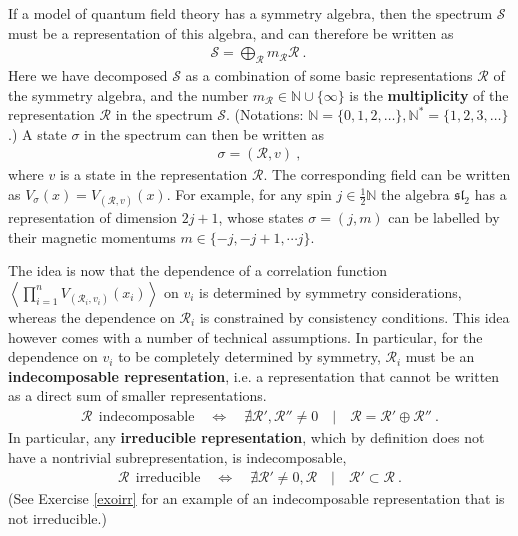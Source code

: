 \documentclass[12pt, a4paper, notitlepage, twoside]{report}
\numberwithin{equation}{section}
\theoremstyle{break}
\begin{document}
If a model of quantum field theory has a symmetry algebra, then the spectrum $\mathcal{S}$ must be a representation of this algebra, and can therefore be written as
\begin{align}
 \mathcal{S} = \bigoplus_\mathcal{R} m_\mathcal{R}  \mathcal{R}\ .\
\label{somr}
\end{align}
Here we have decomposed $\mathcal{S}$ as a combination of some basic representations $\mathcal{R}$ of the symmetry algebra, and the number $m_\mathcal{R} \in {\mathbb{N}}\cup\{\infty\}$ is the \textbf{\boldmath multiplicity} of the representation $\mathcal{R}$ in the spectrum $\mathcal{S}$.
(Notations: $\mathbb{N}= \{0,1,2,\dots\}, \mathbb{N}^*=\{1,2,3,\dots\}$.)
A state $\sigma$ in the spectrum can then be written as 
\begin{align}
 \sigma = (\mathcal{R},v)\ ,
\label{arv}
\end{align}
where $v$ is a state in the representation $\mathcal{R}$. 
The corresponding field can be written as 
$V_\sigma(x)= V_{(\mathcal{R},v)}(x)$. 
For example, for any spin $j\in \frac12 \mathbb{N}$ the algebra $\mathfrak{sl}_2$ has a representation of dimension $2j+1$, whose states $\sigma = (j,m)$ can be labelled by their magnetic momentums $m\in\{-j, -j+1,\cdots j\}$.

The idea is now that the dependence of a correlation function $\left\langle \prod_{i=1}^n V_{(\mathcal{R}_i,v_i)}(x_i)\right\rangle$ on $v_i$ is determined by symmetry considerations, whereas the dependence on $\mathcal{R}_i$ is constrained by consistency conditions.
This idea however comes with a number of technical assumptions.
In particular, for the dependence on $v_i$ to be completely determined by symmetry, $\mathcal{R}_i$ must be an \textbf{\boldmath indecomposable representation}, i.e. a representation that cannot be written as a direct sum of smaller representations.
\begin{align}
 \mathcal{R} \ \ \text{indecomposable} \quad \iff \quad \nexists \mathcal{R}',\mathcal{R}'' \neq 0 \quad | \quad \mathcal{R} = \mathcal{R}'\oplus \mathcal{R}''\ .
\end{align}
In particular, any \textbf{\boldmath irreducible representation}, which by definition does not have a nontrivial subrepresentation, is indecomposable,
\begin{align}
 \mathcal{R} \ \ \text{irreducible} \quad \iff \quad \nexists \mathcal{R}' \neq 0,\mathcal{R} \quad | \quad \mathcal{R}'\subset \mathcal{R}\ .
\end{align}
(See Exercise \ref{exoirr} for an example of an indecomposable representation that is not irreducible.)
\end{document}
